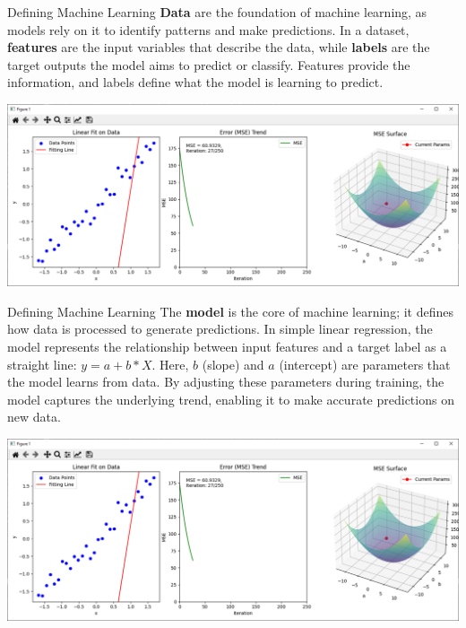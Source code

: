 \documentclass[11pt]{beamer}
\begin{document}
\begin{frame}{Defining Machine Learning}
\footnotesize{\textbf{Data} are the foundation of machine learning, as models rely on it to identify patterns and make predictions. In a dataset, \textbf{features} are the input variables that describe the data, while \textbf{labels} are the target outputs the model aims to predict or classify. Features provide the information, and labels define what the model is learning to predict.}

	\begin{center}
	\includegraphics[scale=0.38]{../05-pictures/lesson-1-1_pic_1.png}
	\end{center}
\end{frame}
\begin{frame}{Defining Machine Learning}
	\footnotesize{The \textbf{model} is the core of machine learning; it defines how data is processed to generate predictions. In simple linear regression, the model represents the relationship between input features and a target label as a straight line: $y = a + b*X$. Here, $b$ (slope) and $a$  (intercept) are parameters that the model learns from data. By adjusting these parameters during training, the model captures the underlying trend, enabling it to make accurate predictions on new data. } 
	\begin{center}
	\includegraphics[scale=0.38]{../05-pictures/lesson-1-1_pic_2.png}
	\end{center}
\end{frame}
\end{document}
